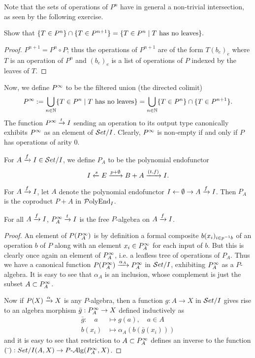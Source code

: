 Note that the sets of operations of $P^n$ have in general a non-trivial
intersection, as seen by the following exercise.
\begin{exercise} Show that $\{ T\in P^n \} \cap \{ T\in P^{n+1} \} = \{ T\in P^n
  \ssep T \text{ has no leaves} \}.$
\end{exercise}
\begin{proof}
  $P^{n+1} = P^n \circ P$; thus the operations of $P^{n+1}$ are of the form
  $T(b_e)_e$ where $T$ is an operation of $P^n$ and $(b_e)_e$ is a list of
  operations of $P$ indexed by the leaves of $T$.
\end{proof}


Now, we define $P^{\moo}$ to be the filtered union (the directed colimit)
\[
  P^\moo := \bigcup_{n\in\NN} \{ T\in P^n \ssep T \text{ has no leaves} \} =
  \bigcup_{n\in\NN} \{ T\in P^n \} \cap \{ T \in P^{n+1} \}.
\]
The function $P^\moo \xto{t} I$ sending an operation to its output type
canonically exhibits $P^\moo$ as an element of $\Set/I$. Clearly, $P^\moo$ is
non-empty if and only if $P$ has operations of arity $0$.



For $A\xto{f} I \in \Set/I$, we define $P_A$ to be the polynomial endofunctor
\[
  I\xot{s} E\xto{p+\emptyset} B+A \xto{(t,f)} I.
\]


\begin{remark}
  For $A\xto{f} I$, let $A$ denote the polynomial endofunctor $I\ot\emptyset\to
  A\xto{f} I$. Then $P_A$ is the coproduct $P+A$ in $\PolyEnd_I$.
\end{remark}

\begin{lemma} \label{lemma:free-algebra} For all $A\xto{f}I$, $P_A^\moo\xto{t}I$
  is the free $P$-algebra on $A\xto{f}I$.
\end{lemma}
\begin{proof}
  An element of $P(P_A^\moo)$ is by definition a formal composite $b(x_i)_{i\in
    p\inv b}$ of an operation $b$ of $P$ along with an element $x_i\in P_A^\moo$
  for each input of $b$. But this is clearly once again an element of
  $P_A^\moo$, i.e. a leafless tree of operations of $P_A$. Thus we have a
  canonical function $P(P_A^\moo)\xto{\alpha_A} P_A^\moo$ in $\Set/I$,
  exhibiting $P_A^\moo$ as a $P$-algebra. It is easy to see that $\alpha_A$ is
  an inclusion, whose complement is just the subset $A\subset P_A^\moo$.

  Now if $P(X)\xto{\alpha} X$ is any $P$-algebra, then a function $g:A\to X$ in
  $\Set/I$ gives rise to an algebra morphism $\bar{g}:P_A^\moo\to X$ defined
  inductively as
  \begin{align*}
    \bar{g} :  \quad a &\mapsto g(a),\quad a\in A \\
    b(x_i) &\mapsto \alpha_A(b(\bar{g}(x_i)))
  \end{align*}
  and it is easy to see that restriction to $A \subset P_A^\moo$ defines an
  inverse to the function $(\bar{\ }):Set/I(A,X)\to P\alg(P_A^\moo,X)$.
\end{proof}

